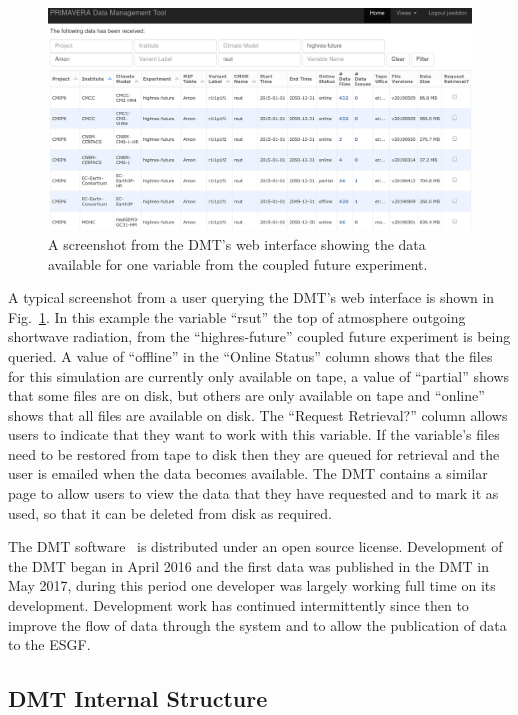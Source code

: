 \documentclass[gmd, manuscript]{copernicus}
\begin{document}
\begin{figure}[t]
	\includegraphics[width=12cm]{fig03.png}
	\caption{A screenshot from the DMT's web interface showing the data available for one variable from the coupled future experiment.}
	\label{dmt_query}
\end{figure}

A typical screenshot from a user querying the DMT's web interface is shown in Fig.~\ref{dmt_query}. In this example the variable ``rsut'' the top of atmosphere outgoing shortwave radiation, from the ``highres-future'' coupled future experiment is being queried. A value of ``offline'' in the ``Online Status'' column shows that the files for this simulation are currently only available on tape, a value of ``partial'' shows that some files are on disk, but others are only available on tape and ``online'' shows that all files are available on disk. The ``Request Retrieval?'' column allows users to indicate that they want to work with this variable. If the variable's files need to be restored from tape to disk then they are queued for retrieval and the user is emailed when the data becomes available. The DMT contains a similar page to allow users to view the data that they have requested and to mark it as used, so that it can be deleted from disk as required.

The DMT software~\citep{Seddon2019} is distributed under an open source license. Development of the DMT began in April 2016 and the first data was published in the DMT in May 2017, during this period one developer was largely working full time on its development. Development work has continued intermittently since then to improve the flow of data through the system and to allow the publication of data to the ESGF. 

\subsection{DMT Internal Structure}
\end{document}
